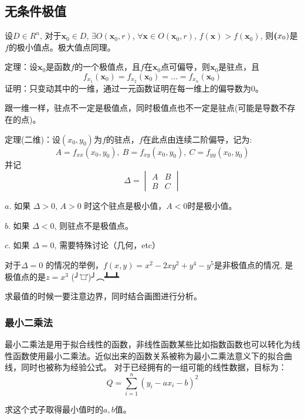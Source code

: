 \documentclass[10pt, a4paper]{article}
\begin{document}
        \subsection{无条件极值}
            设$D\in R^n$, 对于$\textbf{x}_0 \in D$, $\exists O(\textbf{x}_0, r)$, $\forall \textbf{x} \in O(\textbf{x}_0, r)$, $f(\textbf{x}) > f(\textbf{x}_0)$, 则$\textbf({x}_0)$是$f$的极小值点。极大值点同理。

            定理：设$\textbf{x}_0$是函数$f$的一个极值点，且$f$在$\textbf{x}_0$点可偏导，则$\textbf{x}_0$是驻点，且
            $$f_{x_1}(\textbf{x}_0) = f_{x_2}(\textbf{x}_0) = ... = f_{x_n}(\textbf{x}_0)$$
            证明：只变动其中的一维，通过一元函数证明在每一维上的偏导数为0。

            跟一维一样，驻点不一定是极值点，同时极值点也不一定是驻点(可能是导数不存在的点)。
            \newline

            定理(二维)：设$(x_0, y_0)$为$f$的驻点，$f$在此点由连续二阶偏导，记为:
                $$A = f_{xx}(x_0, y_0),\ B = f_{xy}(x_0, y_0),\ C = f_{yy}(x_0, y_0)$$
                并记
                \begin{equation*}
                    \Delta = 
                    \begin{vmatrix}
                        A & B \\
                        B & C
                    \end{vmatrix}
                \end{equation*}

                $a$. 如果 $\Delta > 0$, $A > 0$ 时这个驻点是极小值，$A < 0$时是极小值。

                $b$. 如果 $\Delta < 0$, 则驻点不是极值点。
                
                $c$. 如果 $\Delta = 0$, 需要特殊讨论（几何，etc）
            
                对于$\Delta = 0$ 的情况的举例，$f(x, y) = x ^ 2 - 2xy^2 + y^4 - y^5$是非极值点的情况, 是极值点的是$z = x^3$  (╯‵□′)╯︵┻━┻
            \newline 

            求最值的时候一要注意边界，同时结合画图进行分析。
            
            \subsubsection{最小二乘法}
                最小二乘法是用于拟合线性的函数，非线性函数某些比如指数函数也可以转化为线性函数使用最小二乘法。近似出来的函数关系被称为最小二乘法意义下的拟合曲线，同时也被称为经验公式。 对于已经拥有的一组可能的线性数据，目标为：
                $$Q = \sum_{i = 1}^{n}(y_i - ax_i - b)^2$$
                
                求这个式子取得最小值时的$a, b$值。
                
            
\end{document}
